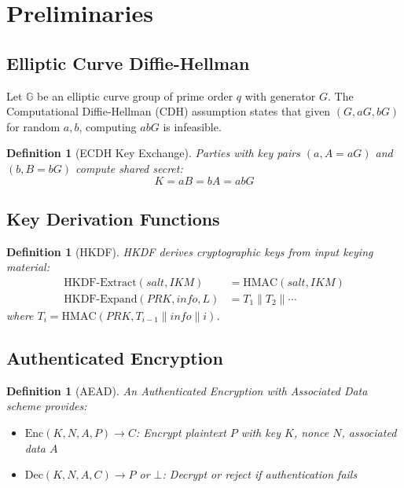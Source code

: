 \documentclass[11pt,a4paper]{article}
\newtheorem{definition}[theorem]{Definition}
\begin{document}
\section{Preliminaries}

\subsection{Elliptic Curve Diffie-Hellman}

Let $\mathbb{G}$ be an elliptic curve group of prime order $q$ with generator $G$. The Computational Diffie-Hellman (CDH) assumption states that given $(G, aG, bG)$ for random $a, b$, computing $abG$ is infeasible.

\begin{definition}[ECDH Key Exchange]
Parties with key pairs $(a, A = aG)$ and $(b, B = bG)$ compute shared secret:
\[
K = aB = bA = abG
\]
\end{definition}

\subsection{Key Derivation Functions}

\begin{definition}[HKDF]
HKDF \cite{hkdf} derives cryptographic keys from input keying material:
\begin{align}
\text{HKDF-Extract}(salt, IKM) &= \text{HMAC}(salt, IKM) \\
\text{HKDF-Expand}(PRK, info, L) &= T_1 \| T_2 \| \cdots
\end{align}
where $T_i = \text{HMAC}(PRK, T_{i-1} \| info \| i)$.
\end{definition}

\subsection{Authenticated Encryption}

\begin{definition}[AEAD]
An Authenticated Encryption with Associated Data scheme provides:
\begin{itemize}
    \item $\text{Enc}(K, N, A, P) \to C$: Encrypt plaintext $P$ with key $K$, nonce $N$, associated data $A$
    \item $\text{Dec}(K, N, A, C) \to P$ or $\bot$: Decrypt or reject if authentication fails
\end{itemize}
\end{definition}
\end{document}
